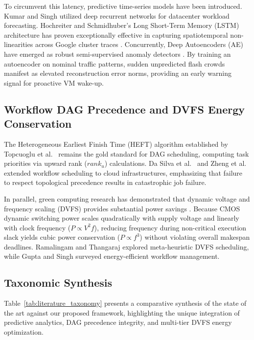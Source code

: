 \documentclass[default,sn-mathphys-num]{sn-jnl}
\theoremstyle{thmstyleone}
\theoremstyle{thmstyletwo}
\theoremstyle{thmstylethree}
\begin{document}
To circumvent this latency, predictive time-series models have been introduced. Kumar and Singh \cite{kumar2021cloud} utilized deep recurrent networks for datacenter workload forecasting. Hochreiter and Schmidhuber's Long Short-Term Memory (LSTM) architecture \cite{hochreiter1997long} has proven exceptionally effective in capturing spatiotemporal non-linearities across Google cluster traces \cite{reiss2012towards}. Concurrently, Deep Autoencoders (AE) have emerged as robust semi-supervised anomaly detectors \cite{sakurada2014anomaly}. By training an autoencoder on nominal traffic patterns, sudden unpredicted flash crowds manifest as elevated reconstruction error norms, providing an early warning signal for proactive VM wake-up.

\subsection{Workflow DAG Precedence and DVFS Energy Conservation}
The Heterogeneous Earliest Finish Time (HEFT) algorithm established by Topcuoglu et al.\ \cite{topcuoglu2002performance} remains the gold standard for DAG scheduling, computing task priorities via upward rank ($rank_u$) calculations. Da Silva et al.\ \cite{da2012workflow} and Zheng et al.\ \cite{zheng2022multi} extended workflow scheduling to cloud infrastructures, emphasizing that failure to respect topological precedence results in catastrophic job failure. 

In parallel, green computing research has demonstrated that dynamic voltage and frequency scaling (DVFS) provides substantial power savings \cite{beloglazov2012energy, devaraju2022dvfs, lesueur2010slow}. Because CMOS dynamic switching power scales quadratically with supply voltage and linearly with clock frequency ($P \propto V^2 f$), reducing frequency during non-critical execution slack yields cubic power conservation ($P \propto f^3$) without violating overall makespan deadlines. Ramalingam and Thangaraj \cite{ramalingam2023energy} explored meta-heuristic DVFS scheduling, while Gupta and Singh \cite{gupta2021survey} surveyed energy-efficient workflow management.

\subsection{Taxonomic Synthesis}
Table~\ref{tab:literature_taxonomy} presents a comparative synthesis of the state of the art against our proposed framework, highlighting the unique integration of predictive analytics, DAG precedence integrity, and multi-tier DVFS energy optimization.
\end{document}
